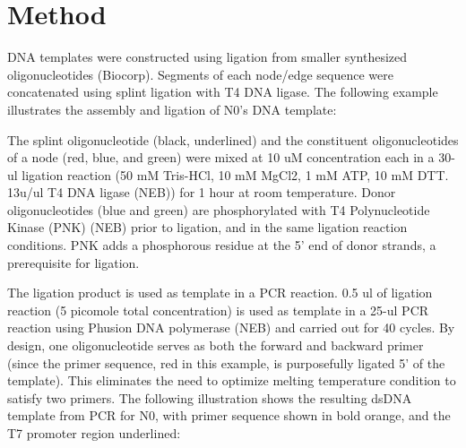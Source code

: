 

\usepackage[table]{xcolor} %
\usepackage{geometry} %
\usepackage{array}
\usepackage{lmodern}
\usepackage{multirow, booktabs} %

\section{Method} \label{sec:method}
			DNA templates were constructed using ligation from smaller synthesized oligonucleotides (Biocorp). Segments of each 
			node/edge sequence were concatenated using splint ligation with T4 DNA ligase. The following example illustrates the 
			assembly and ligation of N0’s DNA template: 
			
		
			The splint oligonucleotide (black, underlined) and the constituent oligonucleotides of a node (red, blue, and green) 
			were mixed at 10 uM concentration each in a 30-ul ligation reaction (50 mM Tris-HCl, 10 mM MgCl2, 1 mM ATP, 10 mM DTT. 
			13u/ul T4 DNA ligase (NEB)) for 1 hour at room temperature. Donor oligonucleotides (blue and green) are phosphorylated 
			with T4 Polynucleotide Kinase (PNK) (NEB) prior to ligation, and in the same ligation reaction conditions. PNK adds a 
			phosphorous residue at the 5’ end of donor strands, a prerequisite for ligation. 
		
			The ligation product is used as template in a PCR reaction. 0.5 ul of ligation reaction (5 picomole total concentration) 
			is used as template in a 25-ul PCR reaction using Phusion DNA polymerase (NEB) and carried out for 40 cycles. By design, one 
			oligonucleotide serves as both the forward and backward primer (since the primer sequence, red in this example, is purposefully 
			ligated 5’ of the template). This eliminates the need to optimize melting temperature condition to satisfy two primers. 
			The following illustration shows the resulting dsDNA template from PCR for N0, with primer sequence shown in bold orange, 
			and the T7 promoter region underlined:  

